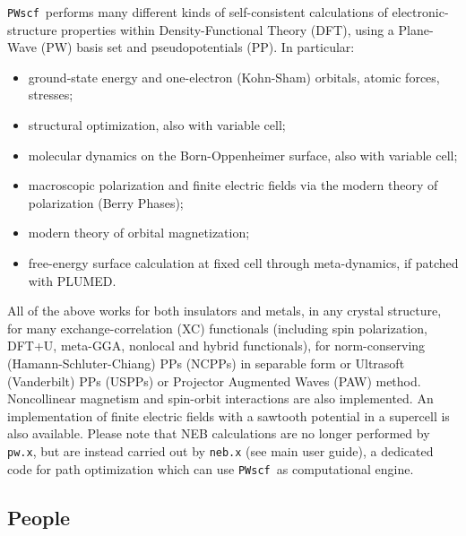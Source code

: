 \documentclass[12pt,a4paper]{article}
\def\PWscf{\texttt{PWscf}}
\def\pwx{\texttt{pw.x}}
\begin{document}
\PWscf\ performs many different kinds of
self-consistent calculations of electronic-structure
properties within
Density-Functional Theory (DFT), using a Plane-Wave (PW) basis set and pseudopotentials (PP).
In particular:
\begin{itemize}
  \item ground-state energy and one-electron (Kohn-Sham) orbitals, 
        atomic forces, stresses;
  \item structural optimization, also with variable cell;
  \item molecular dynamics on the Born-Oppenheimer surface, also with variable cell;
  \item macroscopic polarization and finite electric fields via 
  the modern theory of polarization (Berry Phases);
  \item modern theory of orbital magnetization;
  \item free-energy surface calculation at fixed cell through meta-dynamics, if patched with PLUMED.
\end{itemize}
All of the above works for both insulators and metals, 
in any crystal structure, for many exchange-correlation (XC) functionals
(including spin polarization, DFT+U, meta-GGA, nonlocal and hybrid 
functionals), for
norm-conserving (Hamann-Schluter-Chiang) PPs (NCPPs) in 
separable form or Ultrasoft (Vanderbilt) PPs (USPPs)
or Projector Augmented Waves (PAW) method.
Noncollinear magnetism and spin-orbit interactions 
are also implemented.  An implementation of finite electric 
fields with a sawtooth potential in a supercell is also available.
Please note that NEB calculations are no longer performed by \pwx,
but are instead carried out by \texttt{neb.x} (see main user guide), 
a dedicated code for path optimization which can use \PWscf\ as 
computational engine.

\subsection{People}
\end{document}
